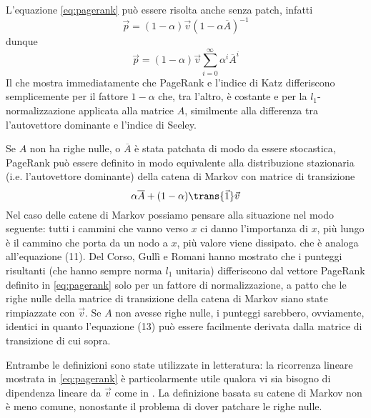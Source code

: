 L'equazione \ref{eq:pagerank} può essere risolta anche senza patch, infatti
\begin{equation}
	\vec{p} = (1 - \alpha)\vec{v}(1 - \alpha\overline{A})^{-1}
\end{equation}
dunque
\begin{equation}
	\vec{p} = (1 - \alpha)\vec{v}\sum_{i = 0}^{\infty}{\alpha^i\overline{A}^i}
\end{equation}
Il che mostra immediatamente che PageRank e l'indice di Katz differiscono semplicemente per il fattore $1 - \alpha$ che, tra l'altro, è costante e per la $l_1$-normalizzazione applicata alla matrice $A$, similmente alla differenza tra l'autovettore dominante e l'indice di Seeley.

Se $A$ non ha righe nulle, o $\overline{A}$ è stata patchata di modo da essere stocastica, PageRank può essere definito in modo equivalente alla distribuzione stazionaria (i.e. l'autovettore dominante) della catena di Markov con matrice di transizione
\begin{equation}
	\alpha\overline{A} + (1 - \alpha)\trans{\vec{1}}\vec{v}
\end{equation}
Nel caso delle catene di Markov possiamo pensare alla situazione nel modo seguente: tutti i cammini che vanno verso $x$ ci danno l'importanza di $x$, più lungo è il cammino che porta da un nodo a $x$, più valore viene dissipato.
che è analoga all'equazione (11). Del Corso, Gullì e Romani \cite{fastprank} hanno mostrato che i punteggi risultanti (che hanno sempre norma $l_1$ unitaria) differiscono dal vettore PageRank definito in \ref{eq:pagerank} solo per un fattore di normalizzazione, a patto che le righe nulle della matrice di transizione della catena di Markov siano state rimpiazzate con $\vec{v}$. Se $A$ non avesse righe nulle, i punteggi sarebbero, ovviamente, identici in quanto l'equazione (13) può essere facilmente derivata dalla matrice di transizione di cui sopra.

Entrambe le definizioni sono state utilizzate in letteratura: la ricorrenza lineare mostrata in \ref{eq:pagerank} è particolarmente utile qualora vi sia bisogno di dipendenza lineare da $\vec{v}$ come in \cite{boldivigni}. La definizione basata su catene di Markov non è meno comune, nonostante il problema di dover patchare le righe nulle.
